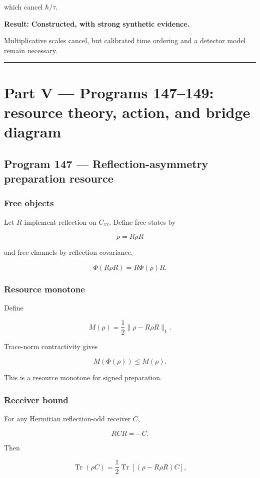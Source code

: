 \documentclass[11pt,a4paper,openany]{report}
\begin{document}
which cancel \(\hbar/\tau\).

\textbf{Result:} \textbf{Constructed, with strong synthetic evidence.}

Multiplicative scales cancel, but calibrated time ordering and a detector model remain necessary.

\par\medskip\hrule\medskip

\chapter{Part V --- Programs 147--149: resource theory, action, and bridge diagram}

\section{Program 147 --- Reflection-asymmetry preparation resource}

\subsection{Free objects}

Let \(R\) implement reflection on \(C_{12}\). Define free states by

\[
\rho=R\rho R
\]

and free channels by reflection covariance,

\[
\Phi(R\rho R)=R\Phi(\rho)R.
\]

\subsection{Resource monotone}

Define

\[
M(\rho)
=
\frac12\|\rho-R\rho R\|_1.
\]

Trace-norm contractivity gives

\[
M(\Phi(\rho))
\le
M(\rho).
\]

This is a resource monotone for signed preparation.

\subsection{Receiver bound}

For any Hermitian reflection-odd receiver \(C\),

\[
RCR=-C.
\]

Then

\[
\operatorname{Tr}(\rho C)
=
\frac12
\operatorname{Tr}\left[
(\rho-R\rho R)C
\right],
\]
\end{document}
